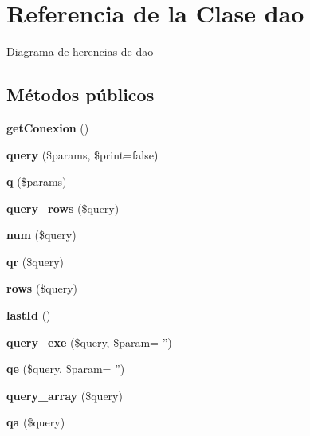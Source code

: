 \hypertarget{classdao}{\section{Referencia de la Clase dao}
\label{classdao}
}


Diagrama de herencias de dao
\subsection*{Métodos públicos}
\begin{DoxyCompactItemize}
\item 
\hypertarget{classdao_a1281a83961eb5b3154684661b7bb64fd}{{\bfseries get\-Conexion} ()}\label{classdao_a1281a83961eb5b3154684661b7bb64fd}

\item 
\hypertarget{classdao_a575ab1ea1c3c8d291f679d66732577f2}{{\bfseries query} (\$params, \$print=false)}\label{classdao_a575ab1ea1c3c8d291f679d66732577f2}

\item 
\hypertarget{classdao_a57b42422089be85e61d4482406f050eb}{{\bfseries q} (\$params)}\label{classdao_a57b42422089be85e61d4482406f050eb}

\item 
\hypertarget{classdao_a1c50ed902c43f3060cefae287fe9bc42}{{\bfseries query\-\_\-rows} (\$query)}\label{classdao_a1c50ed902c43f3060cefae287fe9bc42}

\item 
\hypertarget{classdao_a9ce03691b97623e06038faa287e869e0}{{\bfseries num} (\$query)}\label{classdao_a9ce03691b97623e06038faa287e869e0}

\item 
\hypertarget{classdao_ab56bd29d6b4b00cbf3e95edf875603a5}{{\bfseries qr} (\$query)}\label{classdao_ab56bd29d6b4b00cbf3e95edf875603a5}

\item 
\hypertarget{classdao_ae94c38578a427fe7ded34c092005265f}{{\bfseries rows} (\$query)}\label{classdao_ae94c38578a427fe7ded34c092005265f}

\item 
\hypertarget{classdao_a27993b901efcccbdbb2738ffdec18f16}{{\bfseries last\-Id} ()}\label{classdao_a27993b901efcccbdbb2738ffdec18f16}

\item 
\hypertarget{classdao_a3f03bc98b3a3ca0dc3a946f626ba04bc}{{\bfseries query\-\_\-exe} (\$query, \$param= '')}\label{classdao_a3f03bc98b3a3ca0dc3a946f626ba04bc}

\item 
\hypertarget{classdao_a1b58b1e4fcc51e778fe856562614812f}{{\bfseries qe} (\$query, \$param= '')}\label{classdao_a1b58b1e4fcc51e778fe856562614812f}

\item 
\hypertarget{classdao_a4a983bd3dcad79de7a17c4acf584c714}{{\bfseries query\-\_\-array} (\$query)}\label{classdao_a4a983bd3dcad79de7a17c4acf584c714}

\item 
\hypertarget{classdao_a9ae085281d4bd36561f9786dd48be1b1}{{\bfseries qa} (\$query)}\label{classdao_a9ae085281d4bd36561f9786dd48be1b1}

\end{DoxyCompactItemize}
